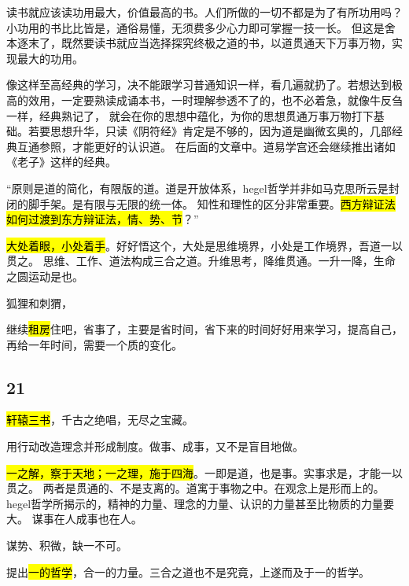 \begin{shadequote}
读书就应该读功用最大，价值最高的书。人们所做的一切不都是为了有所功用吗？小功用的书比比皆是，通俗易懂，无须费多少心力即可掌握一技一长。
但这是舍本逐末了，既然要读书就应当选择探究终极之道的书，以道贯通天下万事万物，实现最大的功用。

像这样至高经典的学习，决不能跟学习普通知识一样，看几遍就扔了。若想达到极高的效用，一定要熟读成诵本书，一时理解参透不了的，也不必着急，就像牛反刍一样，经典熟记了，
就会在你的思想中蕴化，为你的思想贯通万事万物打下基础。若要思想升华，只读《阴符经》肯定是不够的，因为道是幽微玄奥的，几部经典互通参照，才能更好的认识道。
在后面的文章中。道易学宫还会继续推出诸如《老子》这样的经典。
\end{shadequote}


\enquote{原则是道的简化，有限版的道。道是开放体系，hegel哲学并非如马克思所云是封闭的脚手架。是有限与无限的统一体。
知性和理性的区分非常重要。\hl{西方辩证法如何过渡到东方辩证法，情、势、节}？}

\hrulefill

\hl{大处着眼，小处着手}。好好悟这个，大处是思维境界，小处是工作境界，吾道一以贯之。
思维、工作、道法构成三合之道。升维思考，降维贯通。一升一降，生命之圆运动是也。

狐狸和刺猬，

继续\hl{租房}住吧，省事了，主要是省时间，省下来的时间好好用来学习，提高自己，再给一年时间，需要一个质的变化。

\subsection{21}

\hl{轩辕三书}，千古之绝唱，无尽之宝藏。

用行动改造理念并形成制度。做事、成事，又不是盲目地做。

\hl{一之解，察于天地；一之理，施于四海}。一即是道，也是事。实事求是，才能一以贯之。
两者是贯通的、不是支离的。道寓于事物之中。在观念上是形而上的。
hegel哲学所揭示的，精神的力量、理念的力量、认识的力量甚至比物质的力量要大。
谋事在人成事也在人。

谋势、积微，缺一不可。

提出\hl{一的哲学}，合一的力量。三合之道也不是究竟，上遂而及于一的哲学。

